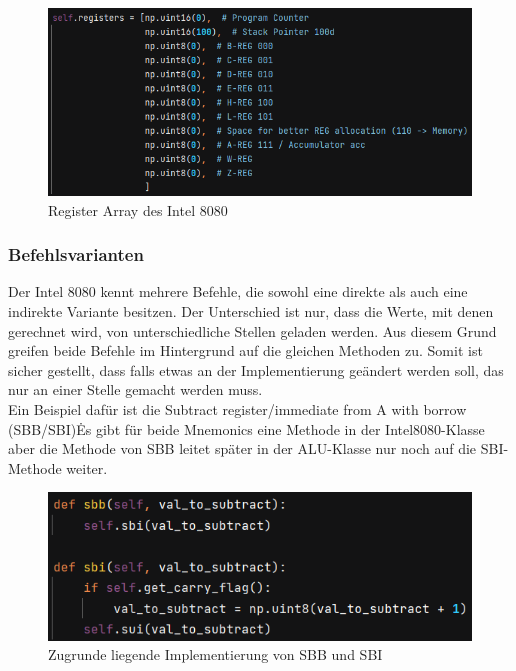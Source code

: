 \documentclass[12pt]{article}
\newcommand{\imgSpaceBefore}{\vspace{10pt}}
\begin{document}
\imgSpaceBefore
\begin{figure}[H]
\centering
\includegraphics[width=15cm]{Bilder/register_array}
\caption{Register Array des Intel 8080}
\label{fig:reg_array}
\end{figure}


\noindent


\subsubsection{Befehlsvarianten}

Der Intel 8080 kennt mehrere Befehle, die sowohl eine direkte als auch eine indirekte Variante besitzen. Der Unterschied ist nur, dass die Werte, mit denen gerechnet wird, von unterschiedliche Stellen geladen werden. Aus diesem Grund greifen beide Befehle im Hintergrund auf die gleichen Methoden zu. Somit ist sicher gestellt, dass falls etwas an der Implementierung geändert werden soll, das nur an einer Stelle gemacht werden muss.
\\
Ein Beispiel dafür ist die \glqq Subtract register/immediate from A with borrow (SBB/SBI)\grqq\. Es gibt für beide Mnemonics eine Methode in der Intel8080-Klasse aber die Methode von SBB leitet später in der ALU-Klasse nur noch auf die SBI-Methode weiter.

\imgSpaceBefore
\begin{figure}[h]
\centering
\includegraphics[width=15cm]{Bilder/DoubleUsedMethodSubtract}
\caption{Zugrunde liegende Implementierung von SBB und SBI}
\label{fig:DoubleUsedMethodSubtract}
\end{figure}
\end{document}
